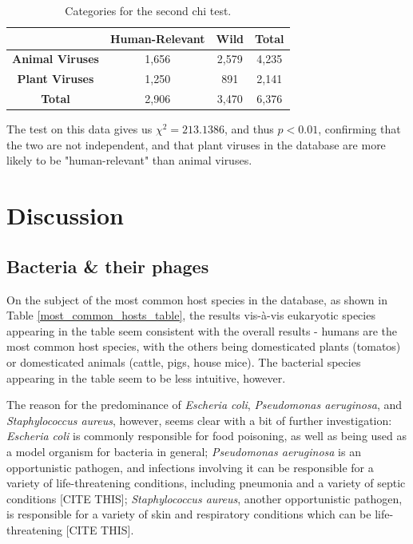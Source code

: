 \documentclass[12pt]{article}
\begin{document}
    \begin{table}[H]
        \begin{center}
            \begin{tabular}{|c|c|c|c|}
                \hline
                                        & \textbf{Human-Relevant} & \textbf{Wild} & \textbf{Total} \\ \hline
                \textbf{Animal Viruses} & 1,656                   & 2,579         & 4,235          \\ \hline
                \textbf{Plant Viruses}  & 1,250                   & 891           & 2,141          \\ \hline
                \textbf{Total}          & 2,906                   & 3,470         & 6,376          \\ \hline
            \end{tabular}
        \end{center}
        \caption{Categories for the second chi test.}
        \label{plants_animals_chi_test}
    \end{table}

    The test on this data gives us $\chi^2 = 213.1386$, and thus $p < 0.01$,
    confirming that the two are not independent, and that plant viruses in the
    database are more likely to be "human-relevant" than animal viruses.
        
    \section{Discussion}

    \subsection{Bacteria \& their phages}

    On the subject of the most common host species in the database, as shown in
    Table \ref{most_common_hosts_table}, the results vis-à-vis eukaryotic species
    appearing in the table seem consistent with the overall results - humans are
    the most common host species, with the others being domesticated plants
    (tomatos) or domesticated animals (cattle, pigs, house mice). The bacterial
    species appearing in the table seem to be less intuitive, however.

    The reason for the predominance of \emph{Escheria coli}, \emph{Pseudomonas
    aeruginosa}, and \emph{Staphylococcus aureus}, however, seems clear with
    a bit of further investigation: \emph{Escheria coli} is commonly responsible
    for food poisoning, as well as being used as a model organism for bacteria
    in general; \emph{Pseudomonas aeruginosa} is an opportunistic pathogen, and
    infections involving it can be responsible for a variety of life-threatening
    conditions, including pneumonia and a variety of septic conditions [CITE THIS];
    \emph{Staphylococcus aureus}, another opportunistic pathogen, is responsible
    for a variety of skin and respiratory conditions which can be life-threatening
    [CITE THIS].
\end{document}
